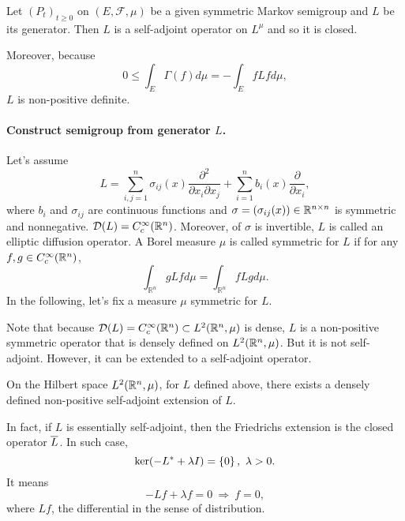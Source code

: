 \begin{prop}
    Let $(P_t)_{t \geq 0}$ on $(E, \mathcal{F},\mu)$ be a given symmetric Markov semigroup and $L$ be its generator. Then $L$ is a self-adjoint operator on $L^{\mu}$ and so it is closed.
\end{prop}

Moreover, because
\begin{equation*}
    0 \leq \int_E \Gamma(f) d\mu = -\int_E fLf d\mu,
\end{equation*}
$L$ is non-positive definite.



\paragraph{Construct semigroup from generator $L$.} Let's assume
\begin{equation*}
    L=\sum_{i, j=1}^n \sigma_{i j}(x) \frac{\partial^2}{\partial x_i \partial x_j}+\sum_{i=1}^n b_i(x) \frac{\partial}{\partial x_i},
\end{equation*}
where $b_i$ and $\sigma_{ij}$ are continuous functions and $\sigma = (\sigma_{ij}(x)) \in \mathbb{R}^{n \times n}$ is symmetric and nonnegative.  $\mathcal{D}(L) = C^\infty_c(\mathbb{R}^n)$. Moreover, of $\sigma$ is invertible, $L$ is called an elliptic diffusion operator.  A Borel measure $\mu$ is called symmetric for $L$ if for any $f,g \in C^\infty_c(\mathbb{R}^n)$,
\begin{equation*}
    \int_{\mathbb{R}^n} g L f d \mu=\int_{\mathbb{R}^n} f L g d \mu.
\end{equation*}
In the following, let's fix a measure $\mu$ symmetric for $L$.

Note that because $\mathcal{D}(L) = C^\infty_c(\mathbb{R}^n) \subset L^2(\mathbb{R}^n,\mu)$ is dense, $L$ is a non-positive symmetric operator that is densely defined on $L^2(\mathbb{R}^n,\mu)$. But it is not self-adjoint. However, it can be extended to a self-adjoint operator.
\begin{thm}
    On the Hilbert space $L^2(\mathbb{R}^n,\mu)$, for $L$ defined above, there exists a densely defined non-positive self-adjoint extension of $L$.
\end{thm}

In fact, if $L$ is essentially self-adjoint, then the Friedrichs extension is the closed operator $\overline{L}$. In such case,
\begin{equation*}
    \ker (-L^* + \lambda I) = \left\{0\right\},~\lambda > 0.
\end{equation*}
It means
\begin{equation*}
    -Lf + \lambda f = 0~\Rightarrow~f = 0,
\end{equation*}
where $Lf$, the differential in the sense of distribution.

